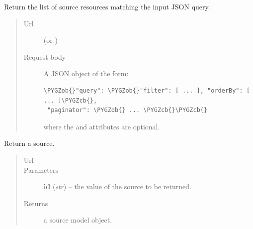 \documentclass[letterpaper,10pt,english]{sphinxmanual}
\def\PYGZob{\char`\{}
\def\PYGZcb{\char`\}}
\begin{document}
\begin{fulllineitems}
\begin{fulllineitems}
\end{fulllineitems}


\begin{fulllineitems}
\label{api:onlinelinguisticdatabase.controllers.sources.SourcesController.search}
Return the list of source resources matching the input JSON query.
\begin{quote}\begin{description}
\item[{Url }] \leavevmode
{} (or )

\item[{Request body}] \leavevmode
A JSON object of the form:

\begin{Verbatim}[commandchars=\\\{\}]
\PYGZob{}"query": \PYGZob{}"filter": [ ... ], "orderBy": [ ... ]\PYGZcb{},
 "paginator": \PYGZob{} ... \PYGZcb{}\PYGZcb{}
\end{Verbatim}

where the  and  attributes are optional.

\end{description}\end{quote}

\end{fulllineitems}


\begin{fulllineitems}
\label{api:onlinelinguisticdatabase.controllers.sources.SourcesController.show}
Return a source.
\begin{quote}\begin{description}
\item[{Url }] \leavevmode
{}

\item[{Parameters}] \leavevmode
\textbf{id} (\emph{str}) -- the  value of the source to be returned.

\item[{Returns}] \leavevmode
a source model object.

\end{description}\end{quote}


\end{fulllineitems}
\end{fulllineitems}
\end{document}
